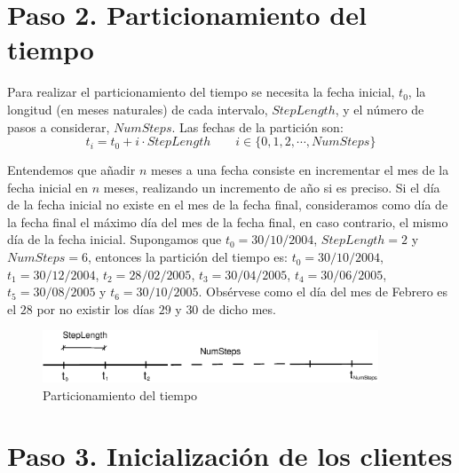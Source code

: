 \section{Paso 2. Particionamiento del tiempo}

Para realizar el particionamiento del tiempo se necesita la fecha inicial, $t_0$,
la longitud (en meses naturales) de cada intervalo, $StepLength$, y el n\'umero
de pasos a considerar, $NumSteps$. Las fechas de la partici\'on son:
\begin{displaymath}
t_i = t_0 + i \cdot StepLength \qquad i \in \{0, 1, 2, \cdots, NumSteps\}
\end{displaymath}

Entendemos que a\~nadir $n$ meses a una fecha consiste en incrementar el
mes de la fecha inicial en $n$ meses, realizando un incremento de a\~no si
es preciso. Si el d\'ia de la fecha inicial no existe en el mes de la fecha
final, consideramos como d\'ia de la fecha final el m\'aximo d\'ia del mes
de la fecha final, en caso contrario, el mismo d\'ia de la fecha inicial.
\newline
\newline
Supongamos que $t_0=30/10/2004$, $StepLength=2$ y $NumSteps=6$, entonces la
partici\'on del tiempo es: $t_0=30/10/2004$, $t_1=30/12/2004$, $t_2=28/02/2005$,
$t_3=30/04/2005$, $t_4=30/06/2005$, $t_5=30/08/2005$ y $t_6=30/10/2005$.
Obs\'ervese como el d\'ia del mes de Febrero es el $28$ por no existir los
d\'ias $29$ y $30$ de dicho mes.

\begin{figure}[!hb]
\begin{center}
\includegraphics[width=10cm,angle=0]{./images/time.eps}
\caption{Particionamiento del tiempo}
\label{timetranches}
\end{center}
\end{figure}


\section{Paso 3. Inicializaci\'on de los clientes}

